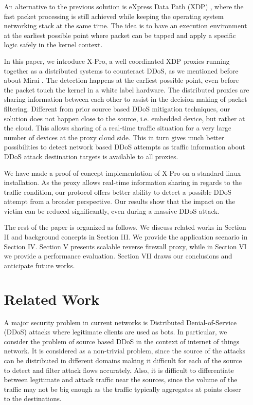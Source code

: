 \documentclass[sigplan,screen]{acmart}
\begin{document}
An alternative to the previous solution is eXpress Data Path (XDP) \citep{10.1145/3281411.3281443}, where the fast packet processing is still achieved while keeping the operating system networking stack at the same time. The idea is to have an execution environment at the earliest possible point where packet can be tapped and apply a specific logic safely in the kernel context. 

In this paper, we introduce X-Pro, a well coordinated XDP proxies running together as a distributed systems to counteract DDoS, as we mentioned before about Mirai \cite{203628}. The detection happens at the earliest possible point, even before the packet touch the kernel in a white label hardware. The distributed proxies are sharing information between each other to assist in the decision making of packet filtering.  Different from prior source based DDoS mitigation techniques, our solution does not happen close to the source, i.e. embedded device, but rather at the cloud. This allows sharing of a real-time traffic situation for a very large number of devices at the proxy cloud side. This in turn gives much better possibilities to detect network based DDoS attempts as traffic information about DDoS attack destination targets is available to all proxies.

We have made a proof-of-concept implementation of X-Pro on a standard linux installation. As the proxy allows real-time information sharing in regards to the traffic condition, our protocol offers better ability to detect a possible DDoS attempt from a broader perspective. Our results show that the impact on the victim can be reduced significantly, even during a massive DDoS attack.

The rest of the paper is organized as follows. We discuss related works in Section II and background concepts in Section III. We provide the application scenario in Section IV. Section V presents scalable reverse firewall proxy, while in Section VI we provide a performance evaluation. Section VII draws our conclusions and anticipate future works.

\section{Related Work}
A major security problem in current networks is Distributed Denial-of-Service (DDoS) attacks where legitimate clients are used as bots. In particular, we consider the problem of source based DDoS in the context of internet of things network. It is considered as a non-trivial problem, since the source of the attacks can be distributed in different domains making it difficult for each of the source to detect and filter attack flows accurately. Also, it is difficult to differentiate between legitimate and attack traffic near the sources, since the volume of the traffic may not be big enough as the traffic typically aggregates at points closer to the destinations.
\end{document}
